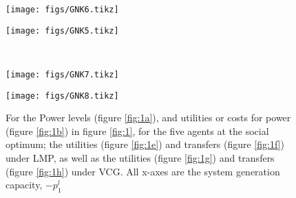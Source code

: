 \begin{figure}[]
	\begin{minipage}[t]{.48\linewidth}
		\texttt{[image: figs/GNK6.tikz]}%
\label{fig:1e}
	\end{minipage}
	\begin{minipage}[t]{.48\linewidth}
		\texttt{[image: figs/GNK5.tikz]}%
\label{fig:1f}
	\end{minipage}
\vspace{5mm}\\
	\begin{minipage}[t]{.48\linewidth}
		\texttt{[image: figs/GNK7.tikz]}%
\label{fig:1g}
	\end{minipage}
	\begin{minipage}[t]{.48\linewidth}
		\texttt{[image: figs/GNK8.tikz]}%
\label{fig:1h}
	\end{minipage}
	\vspace{0.3\baselineskip}
	\caption[Power-levels and utility imputations under LMP and VCG for example network]{For the Power levels (figure \ref{fig:1a}), and utilities or costs for power (figure \ref{fig:1b}) in figure \ref{fig:1}, for the five agents at the social optimum; the utilities (figure \ref{fig:1e}) and transfers (figure \ref{fig:1f}) under LMP, as well as the utilities (figure \ref{fig:1g}) and transfers (figure \ref{fig:1h}) under VCG. All x-axes are the system generation capacity, $-p_1^l$}\label{fig:11}
\end{figure}

